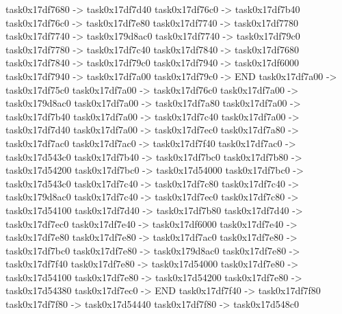 {	task0x17df7680 -> task0x17df7d40
	task0x17df76c0 -> task0x17df7b40
	task0x17df76c0 -> task0x17df7e80
	task0x17df7740 -> task0x17df7780
	task0x17df7740 -> task0x179d8ac0
	task0x17df7740 -> task0x17df79c0
	task0x17df7780 -> task0x17df7c40
	task0x17df7840 -> task0x17df7680
	task0x17df7840 -> task0x17df79c0
	task0x17df7940 -> task0x17df6000
	task0x17df7940 -> task0x17df7a00
	task0x17df79c0 -> END
	task0x17df7a00 -> task0x17df75c0
	task0x17df7a00 -> task0x17df76c0
	task0x17df7a00 -> task0x179d8ac0
	task0x17df7a00 -> task0x17df7a80
	task0x17df7a00 -> task0x17df7b40
	task0x17df7a00 -> task0x17df7c40
	task0x17df7a00 -> task0x17df7d40
	task0x17df7a00 -> task0x17df7ec0
	task0x17df7a80 -> task0x17df7ac0
	task0x17df7ac0 -> task0x17df7f40
	task0x17df7ac0 -> task0x17d543c0
	task0x17df7b40 -> task0x17df7bc0
	task0x17df7b80 -> task0x17d54200
	task0x17df7bc0 -> task0x17d54000
	task0x17df7bc0 -> task0x17d543c0
	task0x17df7c40 -> task0x17df7c80
	task0x17df7c40 -> task0x179d8ac0
	task0x17df7c40 -> task0x17df7ec0
	task0x17df7c80 -> task0x17d54100
	task0x17df7d40 -> task0x17df7b80
	task0x17df7d40 -> task0x17df7ec0
	task0x17df7e40 -> task0x17df6000
	task0x17df7e40 -> task0x17df7e80
	task0x17df7e80 -> task0x17df7ac0
	task0x17df7e80 -> task0x17df7bc0
	task0x17df7e80 -> task0x179d8ac0
	task0x17df7e80 -> task0x17df7f40
	task0x17df7e80 -> task0x17d54000
	task0x17df7e80 -> task0x17d54100
	task0x17df7e80 -> task0x17d54200
	task0x17df7e80 -> task0x17d54380
	task0x17df7ec0 -> END
	task0x17df7f40 -> task0x17df7f80
	task0x17df7f80 -> task0x17d54440
	task0x17df7f80 -> task0x17d548c0
}
